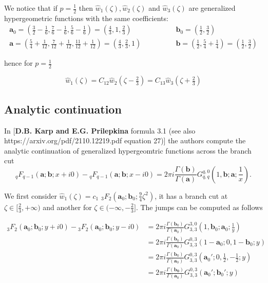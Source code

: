 \documentclass{article}
\begin{document}
\begin{remark}
We notice that if $p=\tfrac{1}{2}$ then $\hat{w}_1(\zeta), \hat{w}_2(\zeta)$ and $\hat{w}_3(\zeta)$ are generalized hypergeometric functions with the same coefficients:
\begin{align*}
\mathbf{a}_0=\left(\frac{3}{2}-\frac{1}{6},\frac{7}{6}-\frac{1}{6},\frac{5}{6}-\frac{1}{6}\right)=\left(\frac{4}{3},1,\frac{2}{3}\right) & \qquad\qquad \mathbf{b}_0=\left(\frac{1}{2},\frac{3}{2}\right) \\
\mathbf{a}=\left(\frac{5}{4}+\frac{1}{12},\frac{7}{12}+\frac{1}{12},\frac{11}{12}+\frac{1}{12}\right)=\left(\frac{4}{3},\frac{2}{3},1\right) & \qquad\qquad \mathbf{b}=\left(\frac{1}{2},\frac{5}{4}+\frac{1}{4}\right)=\left(\frac{1}{2},\frac{3}{2}\right)
\end{align*}

hence for $p=\frac{1}{2}$ 

\begin{equation}
\hat{w}_1(\zeta)=C_{12}\hat{w}_2(\zeta-\tfrac{2}{3})=C_{13}\hat{w}_3(\zeta+\tfrac{2}{3})
\end{equation}
\end{remark}


\subsection{Analytic continuation}

In [\textbf{D.B. Karp and E.G. Prilepkina} formula 3.1 (see also \textsf{https://arxiv.org/pdf/2110.12219.pdf} equation 27)] the authors compute the analytic continuation of generalized hypergeomtric functions across the branch cut
\begin{equation}
{}_qF_{q-1}\left(\mathbf{a};\mathbf{b};x+i0\right)-{}_qF_{q-1}\left(\mathbf{a};\mathbf{b};x-i0\right)=2\pi i\frac{\Gamma(\mathbf{b})}{\Gamma(\mathbf{a})}G_{q,q}^{q,0}\left(1,\mathbf{b};\mathbf{a};\frac{1}{x}\right).
\end{equation}

We first consider $\hat{w}_1(\zeta)=c_1\,\, {}_3F_2\left(\mathbf{a}_0;\mathbf{b}_0;\tfrac{9}{4}\zeta^2\right)$, it has a branch cut at $\zeta\in [\tfrac{2}{3},+\infty)$ and another for $\zeta\in (-\infty,-\tfrac{2}{3}]$. The jumps can be computed as follows 

\begin{align*}
{}_3F_2\left(\mathbf{a}_0;\mathbf{b}_0;y+i0\right)-{}_3F_2\left(\mathbf{a}_0;\mathbf{b}_0;y-i0\right)&=2\pi i\frac{\Gamma(\mathbf{b}_0)}{\Gamma(\mathbf{a}_0)}G_{3,3}^{3,0}\left(1,\mathbf{b}_0;\mathbf{a}_0;\frac{1}{y}\right)\\
&=2\pi i \frac{\Gamma(\mathbf{b}_0)}{\Gamma(\mathbf{a}_0)}G_{3,3}^{0,3}\left(1-\mathbf{a}_0;0,1-\mathbf{b}_0;y\right)\\
&=2\pi i \frac{\Gamma(\mathbf{b}_0)}{\Gamma(\mathbf{a}_0)}G_{3,3}^{0,3}\left(\mathbf{a}_0';0,\frac{1}{2},-\frac{1}{2};y\right)\\
&=2\pi i \frac{\Gamma(\mathbf{b_0})}{\Gamma(\mathbf{a}_0)}G_{3,3}^{0,3}\left(\mathbf{a}_0';\mathbf{b}_0';y\right)
\end{align*}
\end{document}
